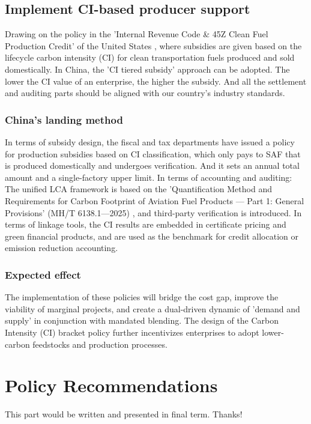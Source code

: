 \documentclass[a4paper,11pt]{article}
\begin{document}
\subsection{Implement CI-based producer support}
Drawing on the policy in the 'Internal Revenue Code \& 45Z Clean Fuel Production Credit' of the United States \cite{irs2025}, where subsidies are given based on the lifecycle carbon intensity (CI) for clean transportation fuels produced and sold domestically. In China, the 'CI tiered subsidy' approach can be adopted. The lower the CI value of an enterprise, the higher the subsidy. And all the settlement and auditing parts should be aligned with our country's industry standards.

\subsubsection{China's landing method}
In terms of subsidy design, the fiscal and tax departments have issued a policy for production subsidies based on CI classification, which only pays to SAF that is produced domestically and undergoes verification. And it sets an annual total amount and a single-factory upper limit. In terms of accounting and auditing: The unified LCA framework is based on the 'Quantification Method and Requirements for Carbon Footprint of Aviation Fuel Products --- Part 1: General Provisions' (MH/T 6138.1---2025) \cite{caac2025}, and third-party verification is introduced. In terms of linkage tools, the CI results are embedded in certificate pricing and green financial products, and are used as the benchmark for credit allocation or emission reduction accounting.

\subsubsection{Expected effect}
The implementation of these policies will bridge the cost gap, improve the viability of marginal projects, and create a dual-driven dynamic of 'demand and supply' in conjunction with mandated blending. The design of the Carbon Intensity (CI) bracket policy further incentivizes enterprises to adopt lower-carbon feedstocks and production processes.



\section{Policy Recommendations}
This part would be written and presented in final term. Thanks!
\end{document}
